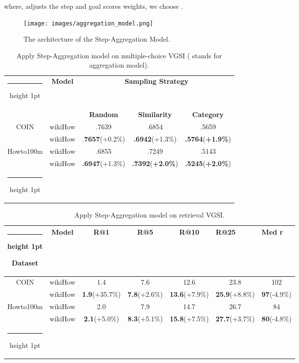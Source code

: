 \documentclass[11pt]{article}
\makeatletter
\newcommand{\thickhline}{\noalign {\ifnum 0=`}\fi \hrule height 1pt
    \futurelet \reserved@a \@xhline
}
\makeatother
\begin{document}
where,  adjusts the step and goal scores weights, we choose .

\begin{figure*}[!t]
\centering
    \texttt{[image: images/aggregation\_model.png]}
    \caption{The architecture of the Step-Aggregation Model.}
    \label{fig:aggregation model}
\end{figure*}

\begin{table*}[!t]

\centering
\begin{tabular}{c|c|ccc}
\thickhline
\multirow{2}{*}{\textbf{Dataset}}   & \multirow{2}{*}{\textbf{Model}}           & \multicolumn{3}{c}{\textbf{Sampling Strategy}}        \\ \cline{3-5} 
                           &                                  & \textbf{Random}        & \textbf{Similarity}    & \textbf{Category}      \\ \hline
\multirow{2}{*}{COIN}      & wikiHow                          & .7639         & .6854         & .5659         \\
                           & wikiHow & .\textbf{7657}(+0.2\%) & \textbf{.6942}(+1.3\%) & \textbf{.5764}(\textbf{+1.9\%}) \\ \hline \hline
\multirow{2}{*}{Howto100m} & wikiHow                          & .6855         & .7249         & .5143         \\
                           & wikiHow & \textbf{.6947}(+1.3\%) & \textbf{.7392}(\textbf{+2.0\%}) & \textbf{.5245}(\textbf{+2.0\%}) \\ \thickhline
\end{tabular}
\caption{Apply Step-Aggregation model on multiple-choice VGSI ( stands for aggregation model).}
\label{agg multi}
\end{table*}

\begin{table*}[!t]
\begin{tabular}{c|c|ccccc}
\thickhline
\textbf{Dataset}                    & \textbf{Model}   & \textbf{R@1}          & \textbf{R@5}         & \textbf{R@10}         & \multicolumn{1}{l}{\textbf{R@25}} & \multicolumn{1}{l}{\textbf{Med r}} \\ \hline
\multirow{2}{*}{COIN}      & wikiHow & 1.4          & 7.6         & 12.6         & 23.8                     & 102                       \\
                           & wikiHow & \textbf{1.9}(+35.7\%) & \textbf{7.8}(+2.6\%) & \textbf{13.6}(+7.9\%) & \textbf{25.9}(+8.8\%)             & \textbf{97}(-4.9\%)                \\ \hline \hline
\multirow{2}{*}{Howto100m} & wikiHow & 2.0          & 7.9         & 14.7         & 26.7                     & 84                        \\
                           & wikiHow & \textbf{2.1}(+5.0\%)  & \textbf{8.3}(+5.1\%) & \textbf{15.8}(+7.5\%) & \textbf{27.7}(+3.7\%)             & \textbf{80}(-4.8\%)                \\ \thickhline
\end{tabular}
\caption{Apply Step-Aggregation model on retrieval VGSI.}
\label{agg retri}
\end{table*}
\end{document}
